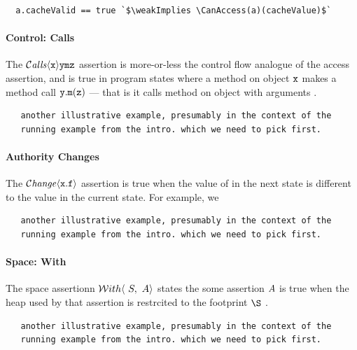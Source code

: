 \begin{lstlisting}
  a.cacheValid == true `$\weakImplies \CanAccess(a)(cacheValue)$` 
\end{lstlisting}

{}


\paragraph{Control: Calls}

The  ${\mathcal{C}}\textrm{\textit{alls}}\langle {\mbox{\tt{x}}}\rangle {{\mbox{\tt{y}}}} {{\mbox{\tt{m}}}} {{{\mbox{\tt{z}}}}}$
assertion is more-or-less the control flow analogue of
the access assertion, and is true 
in program states where a method on object 
${{\mbox{\tt{x}}}}$ makes a method call ${{\mbox{\tt{y}}}}.{{\mbox{\tt{m}}}}({{{\mbox{\tt{z}}}}})$ --- that is it calls method 
{\m} on object {\y} with arguments {\z}.


\begin{lstlisting}
   another illustrative example, presumably in the context of the
   running example from the intro. which we need to pick first.
\end{lstlisting}


\paragraph{Authority Changes}

The $\mathcal{C}\textrm{\textit{hange}}\langle{\mbox{\tt{x}}}.{\mbox{\tt{f}}}\rangle$  assertion is true when the value of 
in the next state is different to the value in the current state.
For example, we 

\begin{lstlisting}
   another illustrative example, presumably in the context of the
   running example from the intro. which we need to pick first.
\end{lstlisting}

\paragraph{Space: With}

The space assertionn ${\mathcal W}ith\langle\ S,\ A\rangle$ states the some assertion $A$ is
true when the heap used by that assertion is restrcited to the
footprint $\S$  
{}.

{}

\begin{lstlisting}
   another illustrative example, presumably in the context of the
   running example from the intro. which we need to pick first.
\end{lstlisting}



